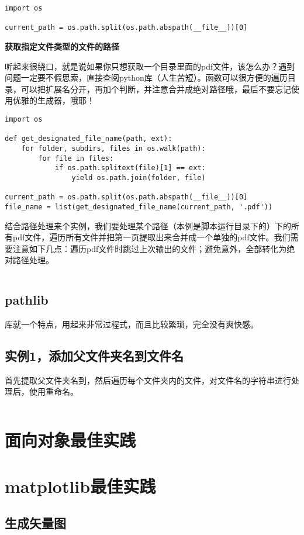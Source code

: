 \begin{verbatim}
import os

current_path = os.path.split(os.path.abspath(__file__))[0]
\end{verbatim}

\textbf{获取指定文件类型的文件的路径}

听起来很绕口，就是说如果你只想获取一个目录里面的pdf文件，该怎么办？遇到问题一定要不假思索，直接查阅python库（人生苦短）。函数可以很方便的遍历目录，可以把扩展名分开，再加个判断，并注意合并成绝对路径哦，最后不要忘记使用优雅的生成器，哦耶！

\begin{verbatim}
import os

def get_designated_file_name(path, ext):
    for folder, subdirs, files in os.walk(path):
        for file in files:
            if os.path.splitext(file)[1] == ext:
                yield os.path.join(folder, file)

current_path = os.path.split(os.path.abspath(__file__))[0]
file_name = list(get_designated_file_name(current_path, '.pdf'))
\end{verbatim}

结合路径处理来个实例，我们要处理某个路径（本例是脚本运行目录下的）下的所有pdf文件，遍历所有文件并把第一页提取出来合并成一个单独的pdf文件。我们需要注意如下几点：遍历pdf文件时跳过上次输出的文件；避免意外，全部转化为绝对路径处理。

\inputminted{python}{code/python/treat_pdf.py}

\subsection{pathlib}

库就一个特点，用起来非常过程式，而且比较繁琐，完全没有爽快感。

\subsection{实例1，添加父文件夹名到文件名}

首先提取父文件夹名到，然后遍历每个文件夹内的文件，对文件名的字符串进行处理后，使用重命名。

\inputminted{python}{code/python/rename_case.py}

\section{面向对象最佳实践}

\section{matplotlib最佳实践}
\subsection{生成矢量图}


